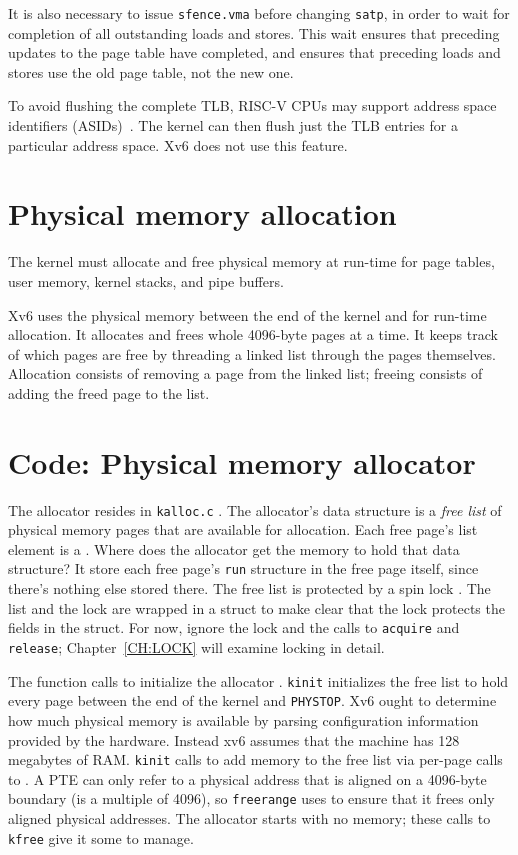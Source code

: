 It is also necessary to issue \texttt{sfence.vma} before changing
\texttt{satp}, in order to wait for completion of all outstanding loads and
stores. This wait ensures that preceding updates to the page table have
completed, and ensures that preceding loads and stores use the old
page table, not the new one.

To avoid flushing the complete TLB, RISC-V CPUs may support address
space identifiers (ASIDs)~\cite{riscv:priv}.  The kernel can then
flush just the TLB entries for a particular address space. Xv6
does not use this feature.

\section{Physical memory allocation}

The kernel must allocate and free physical memory at run-time for
page tables,
user memory,
kernel stacks,
and pipe buffers.

Xv6 uses the physical memory between the end of the kernel and
for run-time allocation. It allocates and frees whole 4096-byte pages
at a time. It keeps track of which pages are free by threading a
linked list through the pages themselves. Allocation consists of
removing a page from the linked list; freeing consists of adding the
freed page to the list.
\section{Code: Physical memory allocator}

The allocator resides in {\tt kalloc.c} .
The allocator's data structure is a
\textit{free list}
of physical memory pages that are available
for allocation.
Each free page's list element is a
.
Where does the allocator get the memory
to hold that data structure?
It store each free page's
\lstinline{run}
structure in the free page itself,
since there's nothing else stored there.
The free list is
protected by a spin lock
.
The list and the lock are wrapped in a struct
to make clear that the lock protects the fields
in the struct.
For now, ignore the lock and the calls to
\lstinline{acquire}
and
\lstinline{release};
Chapter~\ref{CH:LOCK} will examine
locking in detail.

The function
calls
to initialize the allocator
.
\lstinline{kinit}
initializes the free list to hold
every page between the end of the kernel and {\tt PHYSTOP}.
Xv6 ought to determine how much physical
memory is available by parsing configuration information 
provided by the hardware.
Instead xv6 assumes that the machine has
128 megabytes of RAM.
\lstinline{kinit}
calls
to add memory to the free list via per-page calls to
.
A PTE can only refer to a physical address that is aligned
on a 4096-byte boundary (is a multiple of 4096), so
\lstinline{freerange}
uses
to ensure that it frees only aligned physical addresses.
The allocator starts with no memory;
these calls to
\lstinline{kfree}
give it some to manage.

